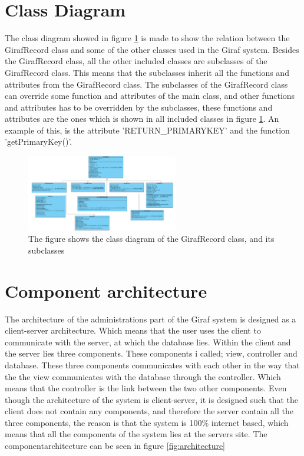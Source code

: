 \section{Class Diagram}

The class diagram showed in figure \ref{fig:diagram} is made to show the relation between the GirafRecord class and some of the other classes used in the Giraf system.
Besides the GirafRecord class, all the other included classes are subclasses of the GirafRecord class. This means that the subclasses inherit all the functions and attributes from the GirafRecord class.
The subclasses of the GirafRecord class can override some function and attributes of the main class, and other functions and attributes has to be overridden by the subclasses, these functions and attributes are the ones which is shown in all included classes in figure \ref{fig:diagram}.
An example of this, is the attribute 'RETURN\_PRIMARYKEY' and the function 'getPrimaryKey()'.
  
\begin{figure}[h]
\centering
\includegraphics[width=250px]{img/classdiagram_Fixed.jpg}
\caption{The figure shows the class diagram of the GirafRecord class, and its subclasses}
\label{fig:diagram}
\end{figure}

\section{Component architecture}

The architecture of the administrations part of the Giraf system is designed as a client-server architecture. Which means that the user uses the client to communicate with the server, at which the database lies. Within the client and the server lies three components. These components i called; view, controller and database. These three components communicates with each other in the way that the the view communicates with the database through the controller. Which means that the controller is the link between the two other components. Even though the architecture of the system is client-server, it is designed such that the client does not contain any components, and therefore the server contain all the three components, the reason is that the system is 100\% internet based, which means that all the components of the system lies at the servers site. The componentarchitecture can be seen in figure \ref{fig:architecture}


